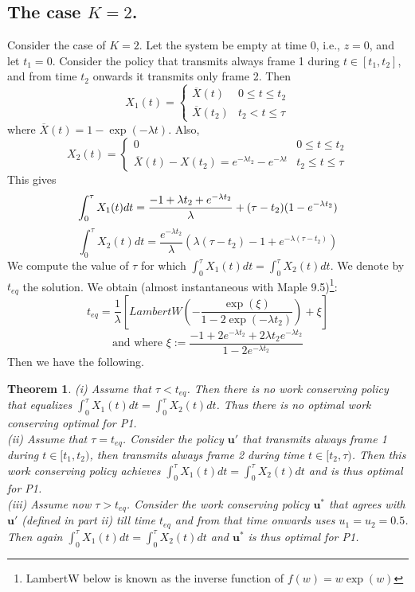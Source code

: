 \documentclass[10pt,twocolumn,conference,final]{IEEEtran}
\newtheorem{thm}{Theorem}[section]
\newcommand{\Xu}{\overline X}
\newcommand{\ubf}{\mathbf u}
\begin{document}
\subsection{The case $K=2$.}
\label{ex1}
Consider the case of $K=2$. Let the system be empty at time 0, i.e., $z=0$, and let $t_1=0$.
Consider the policy that transmits always frame 1 during $t \in [t_1 , t_2 ]$,
and from time $t_2$ onwards it transmits only frame 2.
Then
\[
X_1(t) =
\left\{
\begin{array} {lr}
\Xu(t) & 0 \leq t \leq t_2 \\
\Xu(t_2) & t_2 < t \leq \tau
\end{array}
\right.
\]
where $\Xu(t) = 1 - \exp( - \lambda t ) $. Also,
\[
X_2(t) =
\left\{
\begin{array} {lr}
0  & 0 \leq t \leq t_2 \\
\Xu(t) - X(t_2) =
e^{-\lambda t_2 } - e^{ - \lambda t }  & t_2 \leq t \leq \tau
\end{array}
\right.
\]
This gives\\[-3mm]
\[
\int_0^\tau X_1(t) dt =
\frac{-1+\lambda t_2  + e^{- \lambda t_2 } } {  \lambda }
+ ( \tau - t_2 )(1 - e^{- \lambda t_2 })\\[-3mm]
\]
\[
\int_0^\tau X_2(t) dt =
\frac{e^{-\lambda t_2 }}{\lambda}
( \lambda ( \tau - t_2 ) - 1 + e^{ - \lambda ( \tau - t_2 )} )
\]
We compute the value of $\tau$ for which
$ \int_0^\tau X_1(t) dt = \int_0^\tau X_2(t) dt $. We denote
by $t_{eq}$ the solution. We obtain
(almost instantaneous with Maple 9.5)\footnote{LambertW below is known as
the inverse function of $f(w)=w\exp(w)$}:
\[
t_{eq} = \frac{1}{\lambda}  \left[
LambertW \left( - \frac{ \exp( \xi ) }{ 1 - 2 \exp( - \lambda t_2 ) } \right)
+ \xi \right]
\]
\[
\mbox{and where  }
\xi:= \frac{ - 1 + 2 e^{-\lambda t_2} + 2 \lambda t_2 e^{-\lambda t_2 }}{ 1 - 2 e^{-\lambda t_2 } }
\]
Then we have the following.
\\
\begin{thm}
\label{opt1}
(i) Assume that $\tau < t_{eq}$. Then there is no work conserving policy
that equalizes $ \int_0^\tau X_1(t) dt = \int_0^\tau X_2(t) dt $.
Thus there is no optimal work conserving optimal for P1.
\\
(ii) Assume that $\tau = t_{eq}$.  Consider the policy $\ubf'$ that
transmits always frame 1 during $t \in [t_1 , t_2 )$,
then transmits always frame 2 during time $t \in [t_2 , \tau ) $.
Then this work conserving policy achieves
$ \int_0^\tau X_1(t) dt = \int_0^\tau X_2(t) dt $ and is thus optimal
for P1.
\\
(iii) Assume now $\tau > t_{eq}$. Consider the work conserving
policy $\ubf^*$ that agrees
with $\ubf'$ (defined in part ii)
till time $t_{eq}$ and from that time onwards uses
$u_1=u_2=0.5$. Then again
$ \int_0^\tau X_1(t) dt = \int_0^\tau X_2(t) dt $ and $\ubf^*$ is thus optimal
for P1.
\end{thm}\label{opt1ex}
\end{document}
